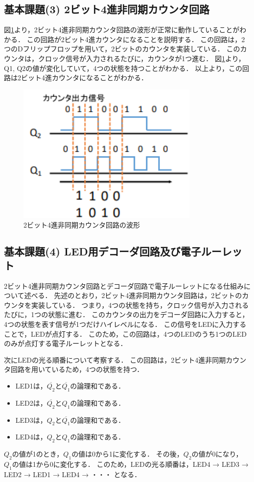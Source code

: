 \documentclass{ltjsarticle}
\begin{document}
\subsection{基本課題(3) 2ビット4進非同期カウンタ回路}
図\ref{fig:3_experiment_results}より，2ビット4進非同期カウンタ回路の波形が正常に動作していることがわかる．
この回路が2ビット4進カウンタになることを説明する．
この回路は，2つのDフリップフロップを用いて，2ビットのカウンタを実装している．
このカウンタは，クロック信号が入力されるたびに，カウンタが1つ進む．
図\ref{fig:3_experiment_results}より，Q1, Q2の値が変化していて，4つの状態を持つことがわかる．
以上より，この回路は2ビット4進カウンタになることがわかる．
\begin{figure}[H]
  \centering
  \includegraphics[width=0.8\textwidth]{figs/ringosilator.png}
  \caption{2ビット4進非同期カウンタ回路の波形}
  \label{fig:3_experiment_results}
\end{figure}

\subsection{基本課題(4) LED用デコーダ回路及び電子ルーレット}
2ビット4進非同期カウンタ回路とデコーダ回路で電子ルーレットになる仕組みについて述べる．
先述のとおり，2ビット4進非同期カウンタ回路は，2ビットのカウンタを実装している．
つまり，4つの状態を持ち，クロック信号が入力されるたびに，1つの状態に進む．
このカウンタの出力をデコーダ回路に入力すると，4つの状態を表す信号が1つだけハイレベルになる．
この信号をLEDに入力することで，LEDが点灯する．
このため，この回路は，4つのLEDのうち1つのLEDのみが点灯する電子ルーレットとなる．

\vspace{\baselineskip}
次にLEDの光る順番について考察する．
この回路は，2ビット4進非同期カウンタ回路を用いているため，4つの状態を持つ．
\begin{itemize}
  \item LED1は，$\overline{Q_2}$と$\overline{Q_1}$の論理和である．
  \item LED2は，$\overline{Q_2}$と${Q_1}$の論理和である．
  \item LED3は，${Q_2}$と$\overline{Q_1}$の論理和である．
  \item LED4は，${Q_2}$と${Q_1}$の論理和である．
\end{itemize}
${Q_2}$の値が1のとき，${Q_1}$の値は0から1に変化する．
その後，${Q_2}$の値が0になり，${Q_1}$の値は1から0に変化する．
このため，LEDの光る順番は，LED4 → LED3 → LED2 → LED1 → LED4 → ・・・ となる．
\end{document}
